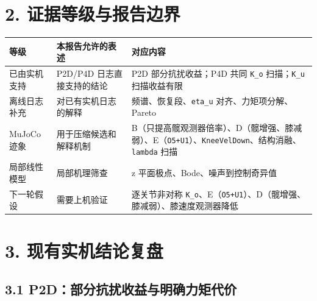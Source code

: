 \section{2. 证据等级与报告边界}\label{ux8bc1ux636eux7b49ux7ea7ux4e0eux62a5ux544aux8fb9ux754c}

\begin{longtable}[]{@{}
  >{\raggedright\arraybackslash}p{}
  >{\raggedright\arraybackslash}p{}
  >{\raggedright\arraybackslash}p{}@{}}
\toprule\noalign{}
\begin{minipage}[b]{\linewidth}\raggedright
等级
\end{minipage} & \begin{minipage}[b]{\linewidth}\raggedright
本报告允许的表述
\end{minipage} & \begin{minipage}[b]{\linewidth}\raggedright
对应内容
\end{minipage} \\
\midrule\noalign{}
\endhead
\bottomrule\noalign{}
\endlastfoot
已由实机支持 & P2D/P4D 日志直接支持的结论 & P2D 部分抗扰收益；P4D 共同 \texttt{K\_o} 扫描；\texttt{K\_u} 扫描收益有限 \\
离线日志补充 & 对已有实机日志的解释 & 频谱、恢复段、\texttt{eta\_u} 对齐、力矩项分解、Pareto \\
MuJoCo 迹象 & 用于压缩候选和解释机制 & B（只提高髋观测器倍率）、D（髋增强、膝减弱）、E（\texttt{O5+U1}）、\texttt{KneeVelDown}、结构消融、\texttt{lambda} 扫描 \\
局部线性模型 & 局部机理筛查 & z 平面极点、Bode、噪声到控制奇异值 \\
下一轮假设 & 需要上机验证 & 逐关节非对称 \texttt{K\_o}、E（\texttt{O5+U1}）、D（髋增强、膝减弱）、膝速度观测器降低 \\
\end{longtable}

\section{3. 现有实机结论复盘}\label{ux73b0ux6709ux5b9eux673aux7ed3ux8bbaux590dux76d8}

\subsection{3.1 P2D：部分抗扰收益与明确力矩代价}\label{p2dux90e8ux5206ux6297ux6270ux6536ux76caux4e0eux660eux786eux529bux77e9ux4ee3ux4ef7}

